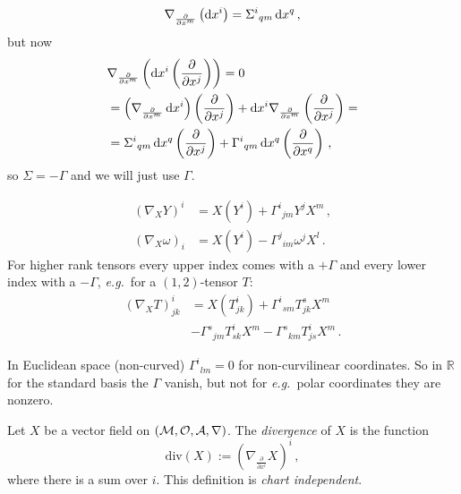 \documentclass[11pt, a4paper, twocolumn]{article} %
\begin{document}
    \begin{equation}
        \nabla_{\frac{\partial}{\partial x^m}}\left( \operatorname{d\!} x^i \right) = \Sigma^{i}{}_{qm}\operatorname{d\!} x^q\,,
    \end{equation}
    but now
    \begin{align*}
        &\nabla_{\frac{\partial}{\partial x^m}}\left( \operatorname{d\!} x^i \left( \frac{\partial}{\partial x^j} \right) \right) = 0\\
        &=\left(\nabla_{\frac{\partial}{\partial x^m}}\operatorname{d\!} x^i\right)\left(\frac{\partial}{\partial x^j}\right) +
            \operatorname{d\!} x^i \nabla_{\frac{\partial}{\partial x^m}}\left( \frac{\partial}{\partial x^j} \right)=\\
            &= \Sigma^{i}{}_{qm}\operatorname{d\!} x^q \left( \frac{\partial}{\partial x^j} \right) +
            \Gamma^{i}{}_{qm}\operatorname{d\!} x^q \left( \frac{\partial}{\partial x^q} \right)\,,
    \end{align*}
    so $\Sigma = - \Gamma$ and we will just use $\Gamma$.
    \begin{center}
    \end{center}
    \begin{align}
        \left( \nabla_X Y \right)^i &= X(Y^i) + \Gamma^{i}{}_{jm}Y^j X^m\,,\\
        \left( \nabla_X \omega \right)_i &= X(Y^i) - \Gamma^{j}{}_{im}\omega^j X^l\,.
    \end{align}
    For higher rank tensors every upper index comes with a $+\Gamma$ and every lower index with a $-\Gamma$,
    \textit{e.g.}\ for a $(1,2)$-tensor $T$:
    \begin{align}
        \nonumber (\nabla_X T)^i_{jk} &= X(T^i_{jk}) + \Gamma^i{}_{sm}T^s_{jk}X^m \\
        &- \Gamma^s{}_{jm}T^i_{sk}X^m - \Gamma^s{}_{km}T^i_{js}X^m\,.
    \end{align}
    \begin{note}
        In Euclidean space (non-curved) $\Gamma^i{}_{lm} = 0$ for non-curvilinear coordinates.
        So in $\mathbb{R}$ for the standard basis the $\Gamma$ vanish, but not for \textit{e.g.}\ 
        polar coordinates they are nonzero.
    \end{note}
    \begin{defn}[Divergence]
        Let $X$ be a vector field on $(\mathcal{M}, \mathcal{O}, \mathcal{A}, \nabla)$.
        The \textit{divergence} of $X$ is the function
        \begin{equation}
            \mathrm{div}(X) := \left( \nabla_{\frac{\partial}{\partial x^i}} X \right)^i\,,
        \end{equation}
        where there is a sum over $i$.
        This definition is \textit{chart independent}.
    \end{defn}
\end{document}
